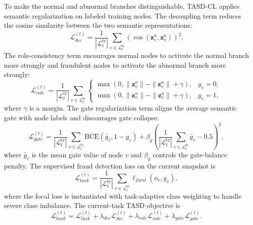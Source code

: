 To make the normal and abnormal branches distinguishable, TASD-CL applies semantic regularization on labeled training nodes. The decoupling term reduces the cosine similarity between the two semantic representations:
\begin{equation}
    \mathcal{L}_{dec}^{(t)}
    =
    \frac{1}{|\mathcal{L}^{\mathrm{tr}}_t|}
    \sum_{v\in\mathcal{L}^{\mathrm{tr}}_t}
    \left(
    \cos(\mathbf{z}^{n}_v,\mathbf{z}^{a}_v)
    \right)^2 .
\end{equation}
The role-consistency term encourages normal nodes to activate the normal branch more strongly and fraudulent nodes to activate the abnormal branch more strongly:
\begin{equation}
    \mathcal{L}_{role}^{(t)}
    =
    \frac{1}{|\mathcal{L}^{\mathrm{tr}}_t|}
    \sum_{v\in\mathcal{L}^{\mathrm{tr}}_t}
    \begin{cases}
    \max(0,\|\mathbf{z}^{a}_v\|-\|\mathbf{z}^{n}_v\|+\gamma), & y_v=0,\\
    \max(0,\|\mathbf{z}^{n}_v\|-\|\mathbf{z}^{a}_v\|+\gamma), & y_v=1,
    \end{cases}
\end{equation}
where $\gamma$ is a margin. The gate regularization term aligns the average semantic gate with node labels and discourages gate collapse:
\begin{equation}
    \mathcal{L}_{gate}^{(t)}
    =
    \frac{1}{|\mathcal{L}^{\mathrm{tr}}_t|}
    \sum_{v\in\mathcal{L}^{\mathrm{tr}}_t}
    \mathrm{BCE}(\bar{g}_v,1-y_v)
    +
    \beta_g
    \left(
    \frac{1}{|\mathcal{L}^{\mathrm{tr}}_t|}
    \sum_{v\in\mathcal{L}^{\mathrm{tr}}_t}
    \bar{g}_v
    -
    0.5
    \right)^2,
\end{equation}
where $\bar{g}_v$ is the mean gate value of node $v$ and $\beta_g$ controls the gate-balance penalty. The supervised fraud detection loss on the current snapshot is
\begin{equation}
    \mathcal{L}_{task}^{(t)}
    =
    \frac{1}{|\mathcal{L}^{\mathrm{tr}}_t|}
    \sum_{v\in\mathcal{L}^{\mathrm{tr}}_t}
    \ell_{focal}(o_v,y_v),
\end{equation}
where the focal loss is instantiated with task-adaptive class weighting to handle severe class imbalance. The current-task TASD objective is
\begin{equation}
\label{eq:tasd-loss}
    \mathcal{L}_{tasd}^{(t)}
    =
    \mathcal{L}_{task}^{(t)}
    +
    \lambda_{dec}\mathcal{L}_{dec}^{(t)}
    +
    \lambda_{role}\mathcal{L}_{role}^{(t)}
    +
    \lambda_{gate}\mathcal{L}_{gate}^{(t)} .
\end{equation}

